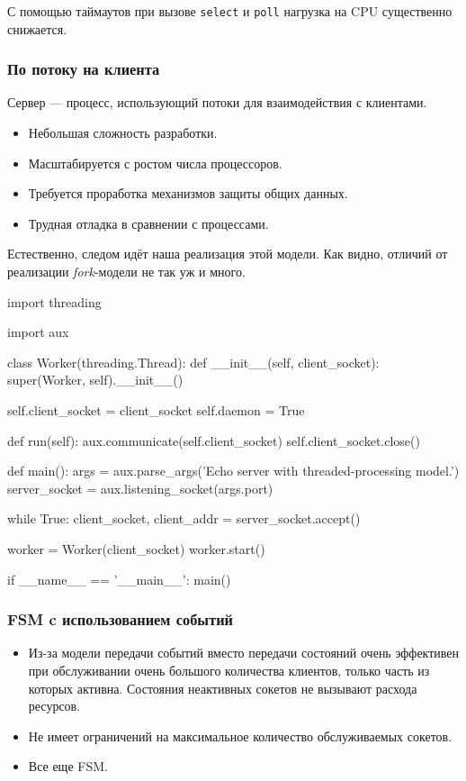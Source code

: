 С помощью таймаутов при вызове \lstinline{select} и \lstinline{poll} нагрузка на CPU существенно снижается.

\subsubsection{По потоку на клиента}
Сервер — процесс, использующий потоки для взаимодействия с клиентами.
\begin{itemize}
  \item[\Checkmark] Небольшая сложность разработки.
  \item[\Checkmark] Масштабируется с ростом числа процессоров.
  \item[\XSolidBrush] Требуется проработка механизмов защиты общих данных.
  \item[\XSolidBrush] Трудная отладка в сравнении с процессами.
\end{itemize}

Естественно, следом идёт наша реализация этой модели. Как видно, отличий от реализации \emph{fork}-модели не так уж и много.
\begin{pylst}{}{}
import threading

import aux

class Worker(threading.Thread):
    def __init__(self, client_socket):
        super(Worker, self).__init__()

        self.client_socket = client_socket
        self.daemon = True

    def run(self):
        aux.communicate(self.client_socket)
        self.client_socket.close()

def main():
    args = aux.parse_args('Echo server with threaded-processing model.')
    server_socket = aux.listening_socket(args.port)

    while True:
        client_socket, client_addr = server_socket.accept()

        worker = Worker(client_socket)
        worker.start()

if __name__ == '__main__':
    main()
\end{pylst}

\subsubsection{FSM c использованием событий}
\begin{itemize}
  \item[\Checkmark] Из-за модели передачи событий вместо передачи состояний очень эффективен при обслуживании очень большого количества клиентов, только часть из которых активна. Состояния неактивных сокетов не вызывают расхода ресурсов.
  \item[\Checkmark] Не имеет ограничений на максимальное количество обслуживаемых сокетов.
  \item[\XSolidBrush] Все еще FSM.
\end{itemize}

